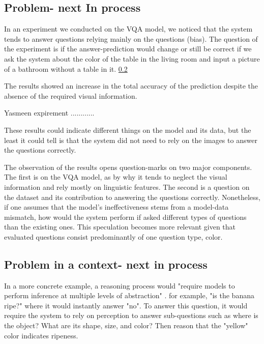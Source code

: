\subsection{Problem- next In process}



In an experiment we conducted on the VQA model, we noticed that the system tends to answer questions relying mainly on the questions (bias). The question of the experiment is if the answer-prediction would change or still be correct if we ask the system about the color of the table in the living room and input a picture of a bathroom without a table in it. \ref{}

The results showed an increase in the total accuracy of the prediction despite the absence of the required visual information.
 
 Yasmeen expirement {............}
 
 These results could indicate different things on the model and its data, but the least it could tell is that the system did not need to rely on the images to answer the questions correctly.


The observation of the results opens question-marks on two major components. The first is on the VQA model, as by why it tends to neglect the visual information and rely mostly on linguistic features. The second is a question on the dataset and its contribution to answering the questions correctly. Nonetheless, if one assumes that the model's ineffectiveness stems from a model-data mismatch, how would the system perform if asked different types of questions than the existing ones. This speculation becomes more relevant given that evaluated questions consist predominantly of one question type, color.



\subsection{Problem in a context- next in process}


In a more concrete example, a reasoning process would "require models to perform inference at multiple levels of abstraction" \cite{selvaraju2020squinting}. for example, "is the banana ripe?" where it would instantly answer "no".  To answer this question, it would require the system to rely on perception to answer sub-questions such as where is the object? What are its shape, size, and color? Then reason that the "yellow" color indicates ripeness.


